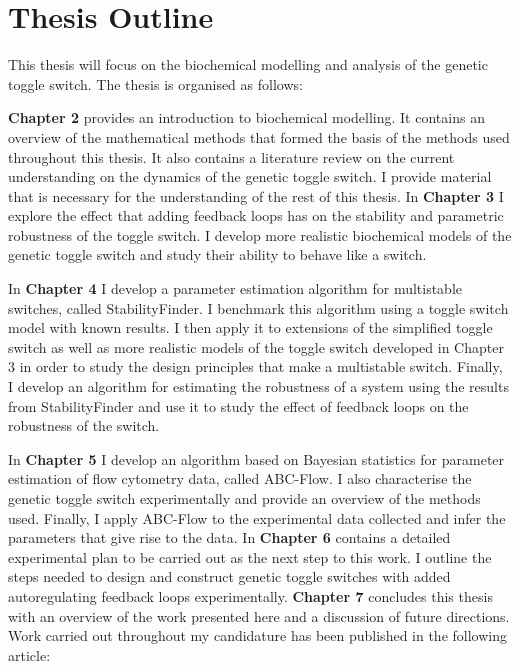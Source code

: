 
\section{Thesis Outline}

This thesis will focus on the biochemical modelling and analysis of the genetic toggle switch. The thesis is organised as follows:

\vskip 0.1in
\noindent \textbf{Chapter 2} provides an introduction to biochemical modelling. It contains an overview of the mathematical methods that formed the basis of the methods used throughout this thesis. It also contains a literature review on the current understanding on the dynamics of the genetic toggle switch. I provide material that is necessary for the understanding of the rest of this thesis. 
\vskip 0.1in
\noindent In \textbf{Chapter 3} I explore the effect that adding feedback loops has on the stability and parametric robustness of the toggle switch. I develop more realistic biochemical models of the genetic toggle switch and study their ability to behave like a switch.  

\vskip 0.1in
\noindent In \textbf{Chapter 4} I develop a parameter estimation algorithm for multistable switches, called StabilityFinder. I benchmark this algorithm using a toggle switch model with known results. I then apply it to extensions of the simplified toggle switch as well as more realistic models of the toggle switch developed in Chapter 3 in order to study the design principles that make a multistable switch. Finally, I develop an algorithm for estimating the robustness of a system using the results from StabilityFinder and use it to study the effect of feedback loops on the robustness of the switch.  

\vskip 0.1in
\noindent In \textbf{Chapter 5} I develop an algorithm based on Bayesian statistics for parameter estimation of flow cytometry data, called ABC-Flow. I also characterise the genetic toggle switch experimentally and provide an overview of the methods used. Finally, I apply ABC-Flow to the experimental data collected and infer the parameters that give rise to the data.
\vskip 0.1in
\noindent In \textbf{Chapter 6} contains a detailed experimental plan to be carried out as the next step to this work. I outline the steps needed to design and construct genetic toggle switches with added autoregulating feedback loops experimentally. 
\vskip 0.1in
\noindent \textbf{Chapter 7} concludes this thesis with an overview of the work presented here and a discussion of future directions. 
\vskip 0.1in
\noindent Work carried out throughout my candidature has been published in the following article:

